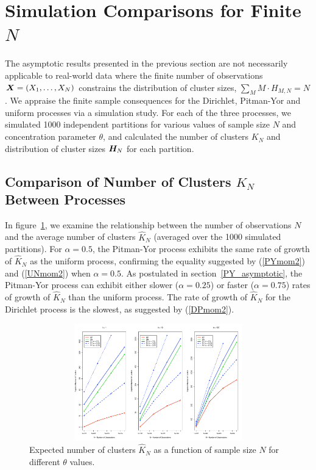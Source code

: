 \documentclass{article}
\begin{document}
\section{Simulation Comparisons for Finite $N$}
\label{simulationstudy}

The asymptotic results presented in the previous section are not
necessarily applicable to real-world data where the finite number of
observations $\boldsymbol{X} = (X_1, \ldots, X_N)$ constrains the distribution of
cluster sizes, $\sum_{M} M \cdot H_{M,N} = N$.  We appraise the finite
sample consequences for the Dirichlet, Pitman-Yor and uniform
processes via a simulation study.  For each of the three processes, we
simulated 1000 independent partitions for various values of sample
size $N$ and concentration parameter $\theta$, and calculated the
number of clusters $K_N$ and distribution of cluster sizes $\boldsymbol{H}_N$ for
each partition.

\subsection{Comparison of Number of Clusters $K_N$ Between Processes}

In figure~\ref{numberofclusters}, we examine the relationship between
the number of observations $N$ and the average number of clusters
$\hat{K}_N$ (averaged over the 1000 simulated partitions). For $\alpha
= 0.5$, the Pitman-Yor process exhibits the same rate of growth of
$\hat{K}_N$ as the uniform process, confirming the equality suggested
by (\ref{PYmom2}) and (\ref{UNmom2}) when $\alpha = 0.5$.  As
postulated in section~\ref{PY_asymptotic}, the Pitman-Yor process can
exhibit either slower ($\alpha=0.25$) or faster ($\alpha=0.75$) rates
of growth of $\hat{K}_N$ than the uniform process. The rate of growth
of $\hat{K}_N$ for the Dirichlet process is the slowest, as suggested
by (\ref{DPmom2}).

\begin{figure}[t]
\centering
\includegraphics[width=5in,height=2in]{figures/fig_numberofclusters.pdf}
\caption{Expected number of clusters $\hat{K}_N$ as a function of
  sample size $N$ for different $\theta$ values.
}\label{numberofclusters}
\vspace{-0.4cm}
\end{figure}
\end{document}
